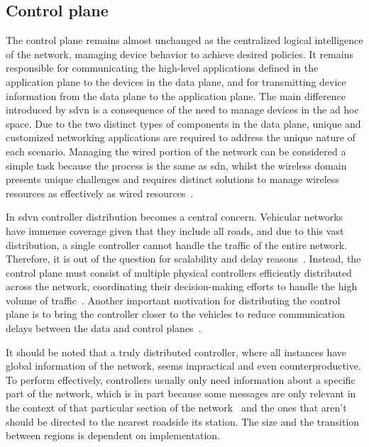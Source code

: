 \subsection{Control plane}
\label{subsec:control_plane}

The control plane remains almost unchanged as the centralized logical intelligence of the network, managing device behavior to achieve desired policies. It remains responsible for communicating the high-level applications defined in the application plane to the devices in the data plane, and for transmitting device information from the data plane to the application plane. The main difference introduced by \gls{sdvn} is a consequence of the need to manage devices in the ad hoc space. Due to the two distinct types of components in the data plane, unique and customized networking applications are required to address the unique nature of each scenario. Managing the wired portion of the network can be considered a simple task because the process is the same as \gls{sdn}, whilst the wireless domain presents unique challenges and requires distinct solutions to manage wireless resources as effectively as wired resources~\cite{cardona_software-defined_2020}.

In \gls{sdvn} controller distribution becomes a central concern. Vehicular networks have immense coverage given that they include all roads, and due to this vast distribution, a single controller cannot handle the traffic of the entire network. Therefore, it is out of the question for scalability and delay reasons~\cite{toufga_openflow_2018}. Instead, the control plane must consist of multiple physical controllers efficiently distributed across the network, coordinating their decision-making efforts to handle the high volume of traffic~\cite{ben_jaballah_security_2020}. Another important motivation for distributing the control plane is to bring the controller closer to the vehicles to reduce communication delays between the data and control planes~\cite{nkenyereye_software-defined_2019}. 

It should be noted that a truly distributed controller, where all instances have global information of the network, seems impractical and even counterproductive. To perform effectively, controllers usually only need information about a specific part of the network, which is in part because some messages are only relevant in the context of that particular section of the network~\cite{cardona_software-defined_2020} and the ones that aren't should be directed to the nearest roadside \gls{its} station. The size and the transition between regions is dependent on implementation. 

